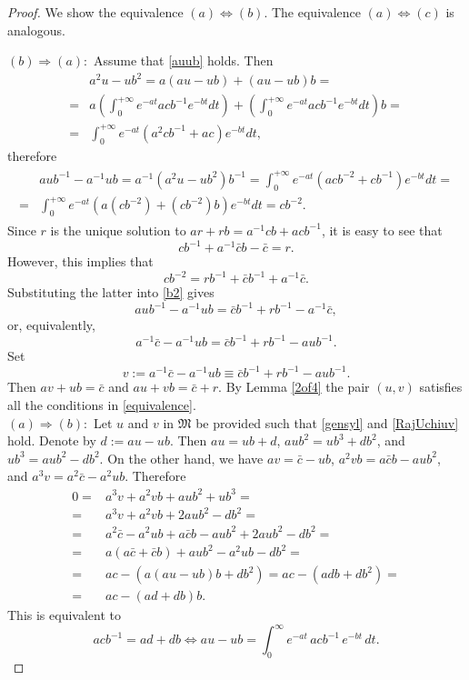 \documentclass{article}
\theoremstyle{definition}
\def\M{\mathfrak{M}}
\begin{document}
\begin{proof} We show the equivalence $(a)\Longleftrightarrow(b)$. The equivalence $(a)\Longleftrightarrow(c)$ is analogous.

$(b)\Rightarrow(a):$ Assume that \eqref{auub} holds. Then
$$\begin{aligned}
&a^2u-ub^2=a(au-ub)+(au-ub)b=\\
=&a\left(\int_0^{+\infty} e^{-at}acb^{-1}e^{-bt}dt\right)+\left(\int_0^{+\infty} e^{-at}acb^{-1}e^{-bt}dt\right)b=\\
=&\int_0^{+\infty}e^{-at}(a^2cb^{-1}+ac)e^{-bt}dt,
\end{aligned}$$
therefore
\begin{eqnarray}
\label{b2}
\begin{aligned}
&aub^{-1}-a^{-1}ub=a^{-1}\left(a^2u-ub^2\right)b^{-1}=\int_0^{+\infty}e^{-at}(acb^{-2}+cb ^{-1})e^{-bt}dt=\\
=&\int_0^{+\infty}e^{-at}\left(a\left(cb^{-2}\right)+\left(cb ^{-2}\right)b\right)e^{-bt}dt=cb^{-2}.\end{aligned}\end{eqnarray}
Since $r$ is the unique solution to $ar+rb=a^{-1}cb+acb^{-1}$, it is easy to see that
$$cb^{-1}+a^{-1}\bar{c}b-\bar{c}=r.$$
However, this implies that 
$$cb^{-2}=rb^{-1}+\bar{c}b^{-1}+a^{-1}\bar{c}.$$
Substituting the latter into \eqref{b2} gives
\begin{equation}
\label{invdiff}
aub^{-1}-a^{-1}ub=\bar{c}b^{-1}+rb^{-1}-a^{-1}\bar{c},\end{equation}
or, equivalently,
$$a^{-1}\bar{c}-a^{-1}ub=\bar{c}b^{-1}+rb^{-1}-aub^{-1}.$$
Set 
$$v:=a^{-1}\bar{c}-a^{-1}ub\equiv \bar{c}b^{-1}+rb^{-1}-aub^{-1}.$$ 
Then $av+ub=\bar{c}$ and $au+vb=\bar{c}+r$. By Lemma \ref{2of4} the pair $(u,v)$ satisfies all the conditions in \eqref{equivalence}.\\


$(a)\Rightarrow(b):$ Let $u$ and $v$ in $\M$ be provided such that \eqref{gensyl} and \eqref{RajUchiuv} hold. Denote by   $d:=au - ub$. Then $au = ub + d$, $aub^2 = ub^3 + db^2$, and $ub^3 = aub^2 - db^2$.
On the other hand, we have $av = \bar{c} - ub$, $
a^2 vb = a\bar{c}b - aub^2$, and $a^3 v = a^2 \bar{c} - a^2 ub$. Therefore
$$\begin{aligned}
0=&a^3 v + a^2 vb + aub^2 + ub^3
=\\
=&a^3 v + a^2 vb + 2aub^2 - db^2
=\\
=&a^2 \bar{c} - a^2 ub + a\bar{c}b - aub^2 + 2aub^2 - db^2=\\
=&a(a\bar{c} + \bar{c}b) + aub^2 - a^2 ub - db^2=\\
=&ac - \left(a(au - ub)b + db^2\right)=ac -\left(adb + db^2\right)=\\
=&ac - (ad + db)b.
\end{aligned}
$$
This is equivalent to
\[
acb^{-1} = ad + db
\Longleftrightarrow
au - ub = \int_0^\infty e^{-at}\, a c b^{-1}\, e^{-bt}\, dt.
\] 
\end{proof}
\end{document}
